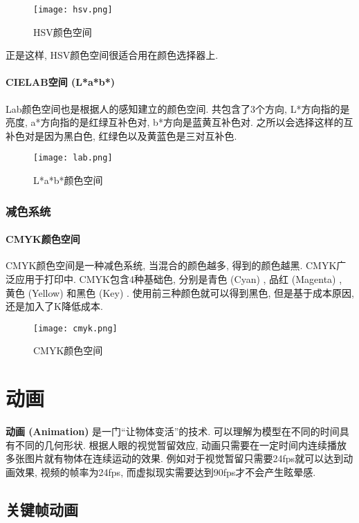 \begin{figure}[H]
	\centering
	\texttt{[image: hsv.png]}
	\caption{HSV颜色空间}
	\label{fig:hsv}
\end{figure}
正是这样, HSV颜色空间很适合用在颜色选择器上. 

\subsubsection{CIELAB空间 (L*a*b*) }

Lab颜色空间也是根据人的感知建立的颜色空间. 共包含了3个方向, L*方向指的是亮度, a*方向指的是红绿互补色对, b*方向是蓝黄互补色对. 之所以会选择这样的互补色对是因为黑白色, 红绿色以及黄蓝色是三对互补色. 

\begin{figure}[H]
	\centering
	\texttt{[image: lab.png]}
	\caption{L*a*b*颜色空间}
	\label{fig:lab}
\end{figure}

\subsection{减色系统}

\subsubsection{CMYK颜色空间}

CMYK颜色空间是一种减色系统, 当混合的颜色越多, 得到的颜色越黑. CMYK广泛应用于打印中. CMYK包含4种基础色, 分别是青色 (Cyan) , 品红 (Magenta) , 黄色 (Yellow) 和黑色 (Key) . 使用前三种颜色就可以得到黑色, 但是基于成本原因, 还是加入了K降低成本. 

\begin{figure}[H]
	\centering
	\texttt{[image: cmyk.png]}
	\caption{CMYK颜色空间}
	\label{fig:cmyk}
\end{figure}

\chapter{动画}

\textbf{动画 (Animation) }是一门``让物体变活”的技术. 可以理解为模型在不同的时间具有不同的几何形状. 根据人眼的视觉暂留效应, 动画只需要在一定时间内连续播放多张图片就有物体在连续运动的效果. 例如对于视觉暂留只需要24fps就可以达到动画效果, 视频的帧率为24fps, 而虚拟现实需要达到90fps才不会产生眩晕感. 

\section{关键帧动画}

